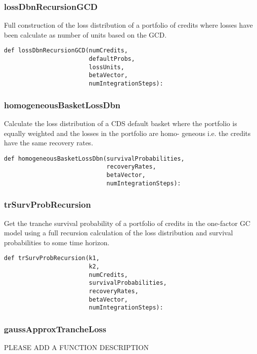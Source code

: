 \documentclass[twoside,11pt]{book}
\begin{document}
\subsubsection*{{\bf lossDbnRecursionGCD}}
Full construction of the loss distribution of a portfolio of credits where losses have been calculate as number of units based on the GCD.  

\begin{lstlisting}
def lossDbnRecursionGCD(numCredits,
                        defaultProbs,
                        lossUnits,
                        betaVector,
                        numIntegrationSteps):
\end{lstlisting}

\subsubsection*{{\bf homogeneousBasketLossDbn}}
Calculate the loss distribution of a CDS default basket where the portfolio is equally weighted and the losses in the portfolio are homo- geneous i.e. the credits have the same recovery rates.  

\begin{lstlisting}
def homogeneousBasketLossDbn(survivalProbabilities,
                             recoveryRates,
                             betaVector,
                             numIntegrationSteps):
\end{lstlisting}

\subsubsection*{{\bf trSurvProbRecursion}}
Get the tranche survival probability of a portfolio of credits in the one-factor GC model using a full recursion calculation of the loss distribution and survival probabilities to some time horizon.  

\begin{lstlisting}
def trSurvProbRecursion(k1,
                        k2,
                        numCredits,
                        survivalProbabilities,
                        recoveryRates,
                        betaVector,
                        numIntegrationSteps):
\end{lstlisting}

\subsubsection*{{\bf gaussApproxTrancheLoss}}
PLEASE ADD A FUNCTION DESCRIPTION
\end{document}
